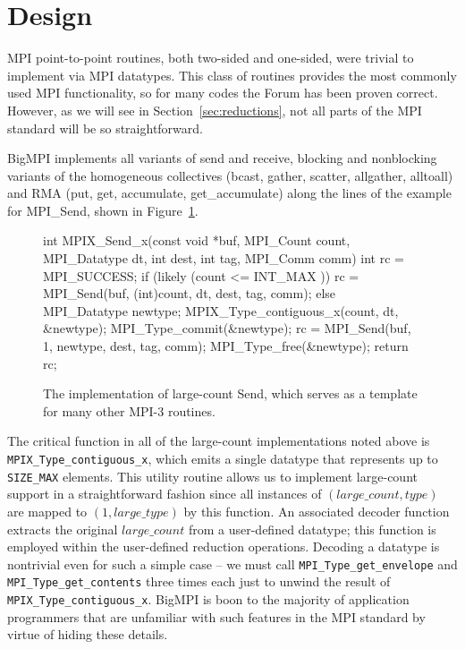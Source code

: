 
\section{Design}


MPI point-to-point routines, both two-sided and one-sided, were
trivial to implement via MPI datatypes.  This class of routines provides the
most commonly used MPI functionality, so for many codes the Forum has been
proven correct.  However, as we will see in Section~\ref{sec:reductions},
not all parts of the MPI standard will be so straightforward.

BigMPI implements all variants of send and receive, blocking and nonblocking variants of
the homogeneous collectives (bcast, gather, scatter, allgather, alltoall)
and RMA (put, get, accumulate, get\_accumulate)
along the lines of the example for MPI\_Send, shown in Figure~\ref{code:mpi_send_x}.

\begin{figure}
\begin{code}
int MPIX_Send_x(const void *buf, MPI_Count count,
                MPI_Datatype dt, int dest,
                int tag, MPI_Comm comm)
{
    int rc = MPI_SUCCESS;
    if (likely (count <= INT_MAX )) {
        rc = MPI_Send(buf, (int)count, dt, dest, tag, comm);
    } else {
        MPI_Datatype newtype;
        MPIX_Type_contiguous_x(count, dt, &newtype);
        MPI_Type_commit(&newtype);
        rc = MPI_Send(buf, 1, newtype, dest, tag, comm);
        MPI_Type_free(&newtype);
    }
    return rc;
}
\end{code}
\caption{The implementation of large-count Send, which serves as a template
for many other MPI-3 routines.\label{code:mpi_send_x}}
\end{figure}

The critical function in all of the large-count implementations noted above
is \texttt{MPIX\_Type\_contiguous\_x}, which emits a single datatype that
represents up to \texttt{SIZE\_MAX} elements.
This utility routine allows us to implement large-count support in a straightforward
fashion since all instances of $(large\_count,type)$ are mapped to $(1,large\_type)$
by this function.
An associated decoder function extracts the original $large\_count$ from a
user-defined datatype; this function is employed within the user-defined reduction
operations.  Decoding a datatype is nontrivial even for such a simple case --
we must call \texttt{MPI\_Type\_get\_envelope} and \texttt{MPI\_Type\_get\_contents}
three times each just to unwind the result of \texttt{MPIX\_Type\_contiguous\_x}.
BigMPI is boon to the majority of application programmers that are unfamiliar 
with such features in the MPI standard by virtue of hiding these details.

